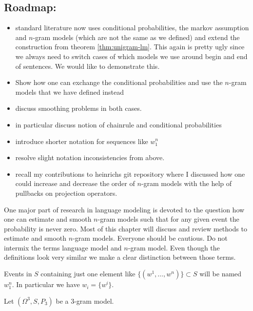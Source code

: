 \documentclass[•]{book}
\begin{document}
\subsection{Roadmap:}
\begin{itemize}
\item standard literature now uses conditional probabilities, the markov assumption and $n$-gram models (which are not the same as we defined) and extend the construction from theorem \ref{thm:unigram-lm}. This again is pretty ugly since we always need to switch cases of which models we use around begin and end of sentences. We would like to demonstrate this.
\item Show how one can exchange the conditional probabilities and use the $n$-gram models that we have defined instead
\item discuss smoothing problems in both cases.
\item in particular discuss notion of chainrule and conditional probabilities
\item introduce shorter notation for sequences like $w_1^n$
\item resolve slight notation inconsistencies from above. 
\item recall my contributions to heinrichs git repository where I discussed how one could increase and decrease the order of $n$-gram models with the help of pullbacks on projection operators. 
\end{itemize}

One major part of research in language modeling is devoted to the question how one can estimate and smooth $n$-gram models such that for any given event the probability is never zero. 
Most of this chapter will discuss and review methods to estimate and smooth $n$-gram models. 
Everyone should be cautious. 
Do not intermix the terms language model and $n$-gram model.
Even though the definitions look very similar we make a clear distinction between those terms. 

\begin{definition}
Events in  $S$ containing just one element like $\{(w^1,\dots,w^n)\}\subset S$ will be named $w_1^n$. 
In particular we have $w_i=\{w^i\}$.
\end{definition}
\begin{example}
Let $(\Omega^3,S,P_3)$ be a $3$-gram model. 
\end{example}
\end{document}
